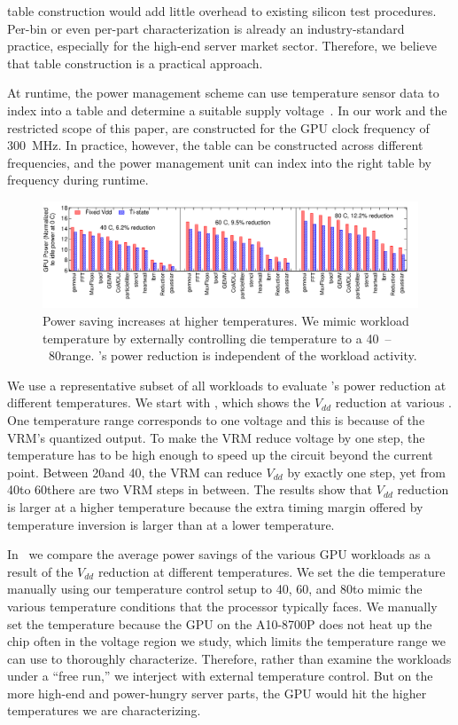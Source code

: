 \tistate table construction would add little overhead to existing silicon test procedures. Per-bin or even per-part characterization is already an industry-standard practice, especially for the high-end server market sector. Therefore, we believe that \tistate table construction is a practical approach.

At runtime, the power management scheme can use temperature sensor data to index into a \tistate table and determine a suitable supply voltage~\cite{sriram2016avfs}. In our work and the restricted scope of this paper, \tistates are constructed for the GPU clock frequency of 300~MHz. In practice, however, the \tistate table can be constructed across different frequencies, and the power management unit can index into the right table by frequency during runtime. 

\begin{figure}[t!]
  \centering
  \includegraphics[trim=0 0 0 0,clip,width=0.95\linewidth]{graphs/evaluate-tistate.pdf}
  \caption{Power saving increases at higher temperatures. We mimic workload temperature by externally controlling die temperature to a 40\C~--~80\C range. \tistate's power reduction is independent of the workload activity. }
  \label{fig:power-save-orig}
\end{figure}

We use a representative subset of all workloads to evaluate \tistate's power reduction at different temperatures. We start with , which shows the $V_{dd}$ reduction at various \tistates. One temperature range corresponds to one voltage and this is because of the VRM's quantized output. To make the VRM reduce voltage by one step, the temperature has to be high enough to speed up the circuit beyond the current point. Between 20\C and 40\C, the VRM can reduce $V_{dd}$ by exactly one step, yet from 40\C to 60\C there are two VRM steps in between. The results show that $V_{dd}$ reduction is larger at a higher temperature because the extra timing margin offered by temperature inversion is larger than at a lower temperature. 

In~ we compare the average power savings of the various GPU workloads as a result of the $V_{dd}$ reduction at different temperatures. We set the die temperature manually using our temperature control setup to 40\C, 60\C, and 80\C to mimic the various temperature conditions that the processor typically faces. We manually set the temperature because the GPU on the A10-8700P does not heat up the chip often in the voltage region we study, which limits the temperature range we can use to thoroughly characterize. Therefore, rather than examine the workloads under a ``free run,'' we interject with external temperature control. But on the more high-end and power-hungry server parts, the GPU would hit the higher temperatures we are characterizing.

